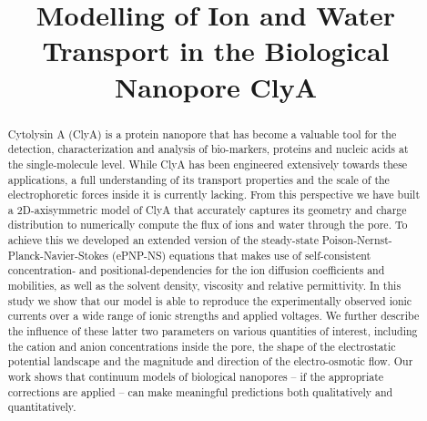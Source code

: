 \documentclass[journal=ancac3,manuscript=article,etalmode=truncate,maxauthors=0,layout=twocolumn]{achemso}
\title{Modelling of Ion and Water Transport in the Biological Nanopore ClyA}
\begin{document}
\begin{tocentry}
\end{tocentry}

\begin{abstract}
\footnotesize
Cytolysin A (ClyA) is a protein nanopore that has become a valuable tool for the detection, characterization
and analysis of bio-markers, proteins and nucleic acids at the single-molecule level. While ClyA has been
engineered extensively towards these applications, a full understanding of its transport properties and the
scale of the electrophoretic forces inside it is currently lacking. From this perspective we have built a
2D-axisymmetric model of ClyA that accurately captures its geometry and charge distribution to numerically
compute the flux of ions and water through the pore. To achieve this we developed an extended version of the
steady-state Poison-Nernst-Planck-Navier-Stokes (ePNP-NS) equations that makes use of self-consistent
concentration- and positional-dependencies for the ion diffusion coefficients and mobilities, as well as the
solvent density, viscosity and relative permittivity. In this study we show that our model is able to
reproduce the experimentally observed ionic currents over a wide range of ionic strengths and applied
voltages. We further describe the influence of these latter two parameters on various quantities of interest,
including the cation and anion concentrations inside the pore, the shape of the electrostatic potential
landscape and the magnitude and direction of the electro-osmotic flow. Our work shows that continuum models of
biological nanopores -- if the appropriate corrections are applied -- can make meaningful predictions both
qualitatively and quantitatively.
\end{abstract}


\end{document}
